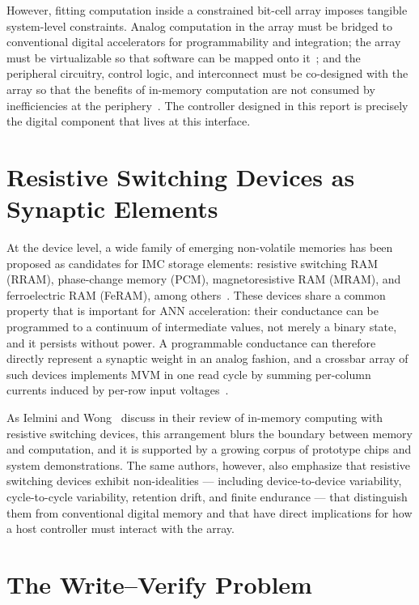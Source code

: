 However, fitting computation inside a constrained bit-cell array imposes
tangible system-level constraints. Analog computation in the array must be
bridged to conventional digital accelerators for programmability and
integration; the array must be virtualizable so that software can be mapped
onto it~\cite{Verma2019IMC}; and the peripheral circuitry, control logic,
and interconnect must be co-designed with the array so that the benefits
of in-memory computation are not consumed by inefficiencies at the
periphery~\cite{Sebastian2020IMC}. The controller designed in this report
is precisely the digital component that lives at this interface.

\section{Resistive Switching Devices as Synaptic Elements}
\label{sec:bg-rram}

At the device level, a wide family of emerging non-volatile memories has
been proposed as candidates for IMC storage elements: resistive switching
RAM (RRAM), phase-change memory (PCM), magnetoresistive RAM (MRAM), and
ferroelectric RAM (FeRAM), among others~\cite{Ielmini2018RRAM}. These
devices share a common property that is important for ANN acceleration:
their conductance can be programmed to a continuum of intermediate
values, not merely a binary state, and it persists without power. A
programmable conductance can therefore directly represent a synaptic
weight in an analog fashion, and a crossbar array of such devices
implements MVM in one read cycle by summing per-column currents induced by
per-row input voltages~\cite{Ielmini2018RRAM, Sebastian2020IMC}.

As Ielmini and Wong~\cite{Ielmini2018RRAM} discuss in their review of
in-memory computing with resistive switching devices, this arrangement
blurs the boundary between memory and computation, and it is supported by
a growing corpus of prototype chips and system demonstrations. The same
authors, however, also emphasize that resistive switching devices exhibit
non-idealities --- including device-to-device variability, cycle-to-cycle
variability, retention drift, and finite endurance --- that distinguish
them from conventional digital memory and that have direct implications
for how a host controller must interact with the array.

\section{The Write--Verify Problem}
\label{sec:bg-writeverify}

